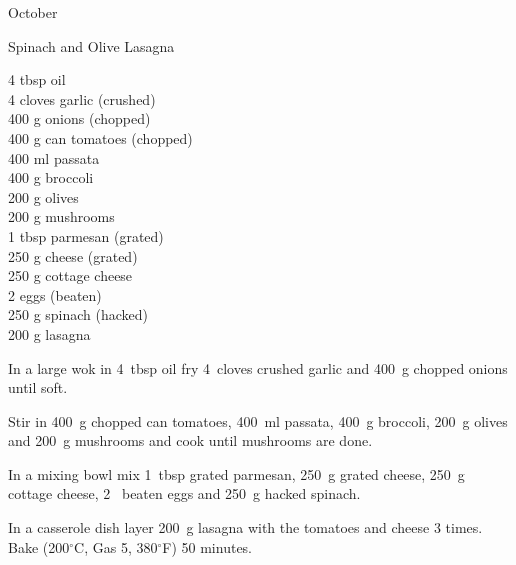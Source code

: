 \begin{menu}{October}
    \begin{recipe}{2}{Spinach and Olive Lasagna}%
		\begin{ingredients}
		4 tbsp oil  \\
	4 cloves garlic (crushed) \\
	400 g onions (chopped) \\
	400 g can tomatoes (chopped) \\
	400 ml passata  \\
	400 g broccoli  \\
	200 g olives  \\
	200 g mushrooms  \\
	1 tbsp parmesan (grated) \\
	250 g cheese (grated) \\
	250 g cottage cheese  \\
	2  eggs (beaten) \\
	250 g spinach (hacked) \\
	200 g lasagna  \\
	
		\end{ingredients}
	
	
	
    \begin{instructions}
    \item 
        In a large wok in
        4~tbsp  oil
        fry
        4~cloves crushed garlic
        and
        400~g chopped onions
        until soft.
      \item 
        Stir in
        400~g chopped can tomatoes,
        400~ml  passata,
        400~g  broccoli,
        200~g  olives
        and
        200~g  mushrooms
        and cook until mushrooms are done.
      \item 
        In a mixing bowl mix
        1~tbsp grated parmesan,
        250~g grated cheese,
        250~g  cottage cheese,
        2~ beaten eggs
        and
        250~g hacked spinach.
      \item 
        In a casserole dish layer
        200~g  lasagna
        with the tomatoes and cheese 3 times.
        Bake (200$^{\circ}$C, Gas 5, 380$^{\circ}$F) 50 minutes.
      
    \end{instructions}
    \end{recipe}%
  

\end{menu}
